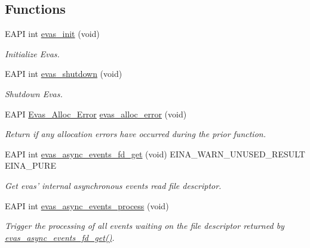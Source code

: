 \subsection*{Functions}
\begin{DoxyCompactItemize}
\item 
EAPI int \hyperlink{group__Evas__Group_ga939a904ec53bf80796a8ad763cbb4c3c}{evas\_\-init} (void)
\begin{DoxyCompactList}\small\item\em Initialize Evas. \item\end{DoxyCompactList}\item 
EAPI int \hyperlink{group__Evas__Group_ga3170193ec2e0ce4d7f0eb55de71060ed}{evas\_\-shutdown} (void)
\begin{DoxyCompactList}\small\item\em Shutdown Evas. \item\end{DoxyCompactList}\item 
EAPI \hyperlink{Evas_8h_ae0181b78df8e248703a72a978d271208}{Evas\_\-Alloc\_\-Error} \hyperlink{group__Evas__Group_ga1c782b4511e3b8678a2166c651053ac9}{evas\_\-alloc\_\-error} (void)
\begin{DoxyCompactList}\small\item\em Return if any allocation errors have occurred during the prior function. \item\end{DoxyCompactList}\item 
EAPI int \hyperlink{group__Evas__Group_ga7e59dbbc6b37d4ce63bea067851ceedd}{evas\_\-async\_\-events\_\-fd\_\-get} (void) EINA\_\-WARN\_\-UNUSED\_\-RESULT EINA\_\-PURE
\begin{DoxyCompactList}\small\item\em Get evas' internal asynchronous events read file descriptor. \item\end{DoxyCompactList}\item 
EAPI int \hyperlink{group__Evas__Group_ga9f99c6cd0bf0621bdd61d1085999ef47}{evas\_\-async\_\-events\_\-process} (void)
\begin{DoxyCompactList}\small\item\em Trigger the processing of all events waiting on the file descriptor returned by \hyperlink{group__Evas__Group_ga7e59dbbc6b37d4ce63bea067851ceedd}{evas\_\-async\_\-events\_\-fd\_\-get()}. \item\end{DoxyCompactList}\item 

\end{DoxyCompactItemize}
